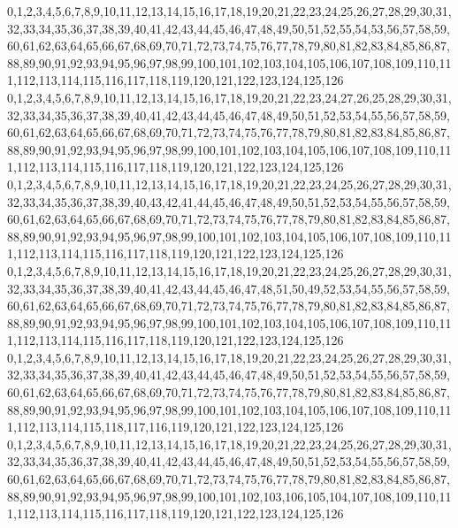 \documentclass[12pt]{article}
\begin{document}
{0,1,2,3,4,5,6,7,8,9,10,11,12,13,14,15,16,17,18,19,20,21,22,23,24,25,26,27,28,29,30,31,32,33,34,35,36,37,38,39,40,41,42,43,44,45,46,47,48,49,50,51,52,55,54,53,56,57,58,59,60,61,62,63,64,65,66,67,68,69,70,71,72,73,74,75,76,77,78,79,80,81,82,83,84,85,86,87,88,89,90,91,92,93,94,95,96,97,98,99,100,101,102,103,104,105,106,107,108,109,110,111,112,113,114,115,116,117,118,119,120,121,122,123,124,125,126\\
0,1,2,3,4,5,6,7,8,9,10,11,12,13,14,15,16,17,18,19,20,21,22,23,24,27,26,25,28,29,30,31,32,33,34,35,36,37,38,39,40,41,42,43,44,45,46,47,48,49,50,51,52,53,54,55,56,57,58,59,60,61,62,63,64,65,66,67,68,69,70,71,72,73,74,75,76,77,78,79,80,81,82,83,84,85,86,87,88,89,90,91,92,93,94,95,96,97,98,99,100,101,102,103,104,105,106,107,108,109,110,111,112,113,114,115,116,117,118,119,120,121,122,123,124,125,126\\
0,1,2,3,4,5,6,7,8,9,10,11,12,13,14,15,16,17,18,19,20,21,22,23,24,25,26,27,28,29,30,31,32,33,34,35,36,37,38,39,40,43,42,41,44,45,46,47,48,49,50,51,52,53,54,55,56,57,58,59,60,61,62,63,64,65,66,67,68,69,70,71,72,73,74,75,76,77,78,79,80,81,82,83,84,85,86,87,88,89,90,91,92,93,94,95,96,97,98,99,100,101,102,103,104,105,106,107,108,109,110,111,112,113,114,115,116,117,118,119,120,121,122,123,124,125,126\\
0,1,2,3,4,5,6,7,8,9,10,11,12,13,14,15,16,17,18,19,20,21,22,23,24,25,26,27,28,29,30,31,32,33,34,35,36,37,38,39,40,41,42,43,44,45,46,47,48,51,50,49,52,53,54,55,56,57,58,59,60,61,62,63,64,65,66,67,68,69,70,71,72,73,74,75,76,77,78,79,80,81,82,83,84,85,86,87,88,89,90,91,92,93,94,95,96,97,98,99,100,101,102,103,104,105,106,107,108,109,110,111,112,113,114,115,116,117,118,119,120,121,122,123,124,125,126\\
0,1,2,3,4,5,6,7,8,9,10,11,12,13,14,15,16,17,18,19,20,21,22,23,24,25,26,27,28,29,30,31,32,33,34,35,36,37,38,39,40,41,42,43,44,45,46,47,48,49,50,51,52,53,54,55,56,57,58,59,60,61,62,63,64,65,66,67,68,69,70,71,72,73,74,75,76,77,78,79,80,81,82,83,84,85,86,87,88,89,90,91,92,93,94,95,96,97,98,99,100,101,102,103,104,105,106,107,108,109,110,111,112,113,114,115,118,117,116,119,120,121,122,123,124,125,126\\
0,1,2,3,4,5,6,7,8,9,10,11,12,13,14,15,16,17,18,19,20,21,22,23,24,25,26,27,28,29,30,31,32,33,34,35,36,37,38,39,40,41,42,43,44,45,46,47,48,49,50,51,52,53,54,55,56,57,58,59,60,61,62,63,64,65,66,67,68,69,70,71,72,73,74,75,76,77,78,79,80,81,82,83,84,85,86,87,88,89,90,91,92,93,94,95,96,97,98,99,100,101,102,103,106,105,104,107,108,109,110,111,112,113,114,115,116,117,118,119,120,121,122,123,124,125,126\\
}
\end{document}
